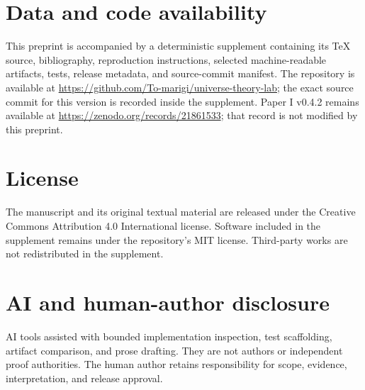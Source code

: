 \documentclass[11pt]{article}
\begin{document}
\section*{Data and code availability}

This preprint is accompanied by a deterministic supplement containing its TeX
source, bibliography, reproduction instructions, selected machine-readable
artifacts, tests, release metadata, and source-commit manifest.  The repository
is available at
\url{https://github.com/To-marigi/universe-theory-lab}; the exact source commit
for this version is recorded inside the supplement.
Paper I v0.4.2 remains available at
\url{https://zenodo.org/records/21861533}; that record is not modified by this
preprint.

\section*{License}

The manuscript and its original textual material are released under the
Creative Commons Attribution 4.0 International license.  Software included in
the supplement remains under the repository's MIT license.  Third-party works
are not redistributed in the supplement.

\section*{AI and human-author disclosure}

AI tools assisted with bounded implementation inspection, test scaffolding,
artifact comparison, and prose drafting.  They are not authors or independent
proof authorities.  The human author retains responsibility for scope,
evidence, interpretation, and release approval.



\end{document}
